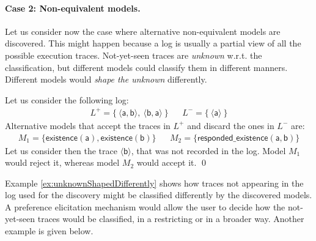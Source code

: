 \paragraph{Case 2: Non-equivalent models.}
Let us consider now the case where alternative non-equivalent models are discovered.
This might happen because a log is usually a partial view of all the possible execution traces. Not-yet-seen traces are \emph{unknown} w.r.t. the classification, but different models could classify them in different manners. Different models would \emph{shape the unknown} differently.

\begin{example}
\label{ex:unknownShapedDifferently}
Let us consider the following log:
\begin{align*}
L^+ = \{\ \langle \mathsf{a}, \mathsf{b} \rangle,\ \langle \mathsf{b}, \mathsf{a} \rangle \ \} && 
L^- = \{\ \langle \mathsf{a} \rangle \ \}
\end{align*}
%
Alternative models that accept the traces in $L^+$ and discard the ones in $L^-$ are:
\begin{align*}
M_1 = \{ \mathsf{existence(a),existence(b)}\} && 
M_2 = \{ \mathsf{responded\_existence(a, b)}\}
\end{align*}
%
Let us consider then the trace $\langle \mathsf{b} \rangle$, that was not recorded in the log. Model $M_1$ %
would reject it, whereas model $M_2$ %
would accept it.
\qed
\end{example}

Example \ref{ex:unknownShapedDifferently} shows how traces not appearing in the log used for the discovery might be classified differently by the discovered models. A preference elicitation mechanism would allow the  user to decide how the not-yet-seen traces would be classified, in a restricting or in a broader way. Another example is given below.

